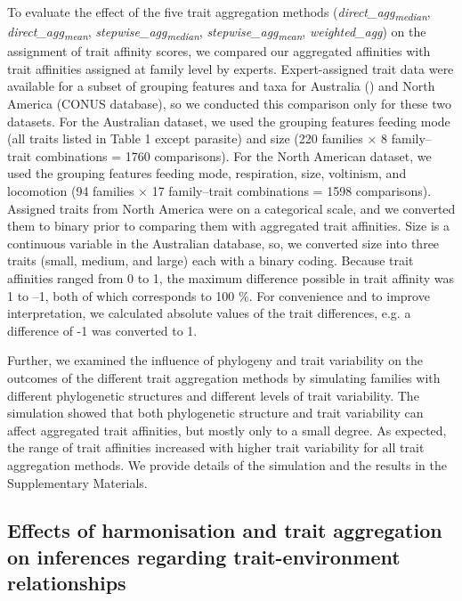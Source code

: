 \documentclass[12pt]{article}
\begin{document}
To evaluate the effect of the five trait aggregation methods
(\textit{direct\_agg\textsubscript{median}}, \textit{direct\_agg\textsubscript{mean}}, \textit{stepwise\_agg\textsubscript{median}}, \textit{stepwise\_agg\textsubscript{mean}}, \textit{weighted\_agg}) on the assignment of trait affinity scores, we compared our aggregated affinities with trait affinities assigned at family level by experts. Expert-assigned trait data were available for a subset of grouping features and taxa for Australia (\cite{chessman_dissolved-oxygen_2018}) and North America (CONUS database), so we conducted this comparison only for these two datasets. For the Australian dataset, we used the grouping features feeding mode (all traits listed in Table 1 except parasite) and size (220 families $\times$ 8 family–trait combinations = 1760 comparisons). For the North American dataset, we used the grouping features feeding mode, respiration, size, voltinism, and locomotion (94 families $\times$ 17 family–trait combinations = 1598 comparisons). Assigned traits from North America were on a categorical scale, and we converted them to binary prior to comparing them with aggregated trait affinities. Size is a continuous variable in the Australian database, so, we converted size into three traits (small, medium, and large) each with a binary coding. Because trait affinities ranged from 0 to 1, the maximum difference possible in trait affinity was 1 to –1, both of which corresponds to 100 \%. For convenience and to improve interpretation, we calculated absolute values of the trait differences, e.g. a difference of -1 was converted to 1.

Further, we examined the influence of phylogeny and trait variability on the outcomes of the different trait aggregation methods by simulating families with different phylogenetic structures and different levels of trait variability. The simulation showed that both phylogenetic structure and trait variability can affect aggregated trait affinities, but mostly only to a small degree. As expected, the range of trait affinities increased with higher trait variability for all trait aggregation methods. We provide details of the simulation and the results in the Supplementary Materials.


\subsection*{Effects of harmonisation and trait aggregation on inferences regarding trait-environment relationships}
\end{document}
